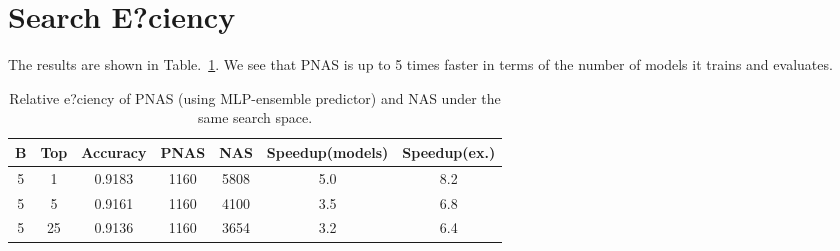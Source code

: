 \documentclass{article}
\begin{document}
\section{Search E?ciency}
The results are shown in Table.~\ref{tab1}. We see that PNAS is up to 5 times faster in terms of the number of models it trains and evaluates. 
\begin{table}[htbp]
\centering
\begin{tabular}{|c|c|c|c|c|c|c|}
\hline
B & Top & Accuracy &  PNAS  & NAS & Speedup(models) & Speedup(ex.) \\
\hline
5 & 1 & 0.9183 & 1160 & 5808 & 5.0 & 8.2  \\
\hline
5 & 5 & 0.9161 & 1160 & 4100 & 3.5 & 6.8  \\
\hline
5 & 25 & 0.9136 & 1160 & 3654 & 3.2 & 6.4 \\
\hline
\end{tabular}
\caption{ Relative e?ciency of PNAS (using MLP-ensemble predictor) and NAS under the same search space.}
\label{tab1}
\end{table}


\end{document}
